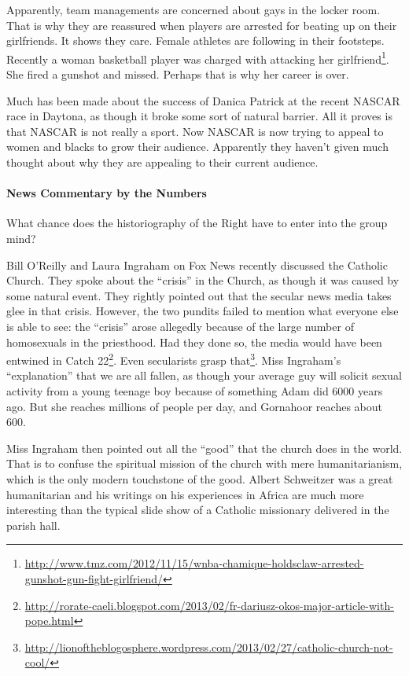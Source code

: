 Apparently, team managements are concerned about gays in the locker room. That is why they are reassured when players are arrested for beating up on their girlfriends. It shows they care. Female athletes are following in their footsteps. Recently a woman basketball player was charged with attacking her girlfriend\footnote{\url{http://www.tmz.com/2012/11/15/wnba-chamique-holdsclaw-arrested-gunshot-gun-fight-girlfriend/}}. She fired a gunshot and missed. Perhaps that is why her career is over.

Much has been made about the success of Danica Patrick at the recent NASCAR race in Daytona, as though it broke some sort of natural barrier. All it proves is that NASCAR is not really a sport. Now NASCAR is now trying to appeal to women and blacks to grow their audience. Apparently they haven't given much thought about why they are appealing to their current audience.

\paragraph{News Commentary by the Numbers}


What chance does the historiography of the Right have to enter into the group mind?

Bill O'Reilly and Laura Ingraham on Fox News recently discussed the Catholic Church. They spoke about the ``crisis'' in the Church, as though it was caused by some natural event. They rightly pointed out that the secular news media takes glee in that crisis. However, the two pundits failed to mention what everyone else is able to see: the ``crisis'' arose allegedly because of the large number of homosexuals in the priesthood. Had they done so, the media would have been entwined in Catch 22\footnote{\url{http://rorate-caeli.blogspot.com/2013/02/fr-dariusz-okos-major-article-with-pope.html}}. Even secularists grasp that\footnote{\url{http://lionoftheblogosphere.wordpress.com/2013/02/27/catholic-church-not-cool/}}. Miss Ingraham's ``explanation'' that we are all fallen, as though your average guy will solicit sexual activity from a young teenage boy because of something Adam did 6000 years ago. But she reaches millions of people per day, and Gornahoor reaches about 600.

Miss Ingraham then pointed out all the ``good'' that the church does in the world. That is to confuse the spiritual mission of the church with mere humanitarianism, which is the only modern touchstone of the good. Albert Schweitzer was a great humanitarian and his writings on his experiences in Africa are much more interesting than the typical slide show of a Catholic missionary delivered in the parish hall.

